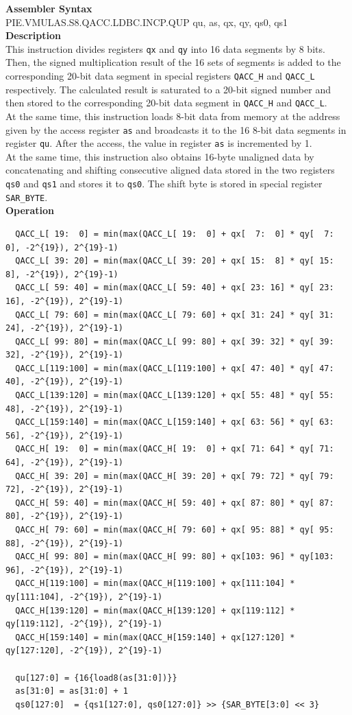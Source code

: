 \textbf{Assembler Syntax} \\
PIE.VMULAS.S8.QACC.LDBC.INCP.QUP qu, as, qx, qy, qs0, qs1 \\
\textbf{Description} \\
This instruction divides registers \lstinline{qx} and \lstinline{qy} into 16 data segments by 8 bits. Then, the signed multiplication result of the 16 sets of segments is added to the corresponding 20-bit data segment in special registers \lstinline{QACC_H} and \lstinline{QACC_L} respectively. The calculated result is saturated to a 20-bit signed number and then stored to the corresponding 20-bit data segment in \lstinline{QACC_H} and \lstinline{QACC_L}.\\
At the same time, this instruction loads 8-bit data from memory at the address given by the access register \lstinline{as} and broadcasts it to the 16 8-bit data segments in register \lstinline{qu}. After the access, the value in register \lstinline{as} is incremented by 1.\\
At the same time, this instruction also obtains 16-byte unaligned data by concatenating and shifting consecutive aligned data stored in the two registers \lstinline{qs0} and \lstinline{qs1} and stores it to \lstinline{qs0}. The shift byte is stored in special register \lstinline{SAR_BYTE}.\\
\textbf{Operation}
\begin{lstlisting}
  QACC_L[ 19:  0] = min(max(QACC_L[ 19:  0] + qx[  7:  0] * qy[  7:  0], -2^{19}), 2^{19}-1)
  QACC_L[ 39: 20] = min(max(QACC_L[ 39: 20] + qx[ 15:  8] * qy[ 15:  8], -2^{19}), 2^{19}-1)
  QACC_L[ 59: 40] = min(max(QACC_L[ 59: 40] + qx[ 23: 16] * qy[ 23: 16], -2^{19}), 2^{19}-1)
  QACC_L[ 79: 60] = min(max(QACC_L[ 79: 60] + qx[ 31: 24] * qy[ 31: 24], -2^{19}), 2^{19}-1)
  QACC_L[ 99: 80] = min(max(QACC_L[ 99: 80] + qx[ 39: 32] * qy[ 39: 32], -2^{19}), 2^{19}-1)
  QACC_L[119:100] = min(max(QACC_L[119:100] + qx[ 47: 40] * qy[ 47: 40], -2^{19}), 2^{19}-1)
  QACC_L[139:120] = min(max(QACC_L[139:120] + qx[ 55: 48] * qy[ 55: 48], -2^{19}), 2^{19}-1)
  QACC_L[159:140] = min(max(QACC_L[159:140] + qx[ 63: 56] * qy[ 63: 56], -2^{19}), 2^{19}-1)
  QACC_H[ 19:  0] = min(max(QACC_H[ 19:  0] + qx[ 71: 64] * qy[ 71: 64], -2^{19}), 2^{19}-1)
  QACC_H[ 39: 20] = min(max(QACC_H[ 39: 20] + qx[ 79: 72] * qy[ 79: 72], -2^{19}), 2^{19}-1)
  QACC_H[ 59: 40] = min(max(QACC_H[ 59: 40] + qx[ 87: 80] * qy[ 87: 80], -2^{19}), 2^{19}-1)
  QACC_H[ 79: 60] = min(max(QACC_H[ 79: 60] + qx[ 95: 88] * qy[ 95: 88], -2^{19}), 2^{19}-1)
  QACC_H[ 99: 80] = min(max(QACC_H[ 99: 80] + qx[103: 96] * qy[103: 96], -2^{19}), 2^{19}-1)
  QACC_H[119:100] = min(max(QACC_H[119:100] + qx[111:104] * qy[111:104], -2^{19}), 2^{19}-1)
  QACC_H[139:120] = min(max(QACC_H[139:120] + qx[119:112] * qy[119:112], -2^{19}), 2^{19}-1)
  QACC_H[159:140] = min(max(QACC_H[159:140] + qx[127:120] * qy[127:120], -2^{19}), 2^{19}-1)

  qu[127:0] = {16{load8(as[31:0])}}
  as[31:0] = as[31:0] + 1
  qs0[127:0]  = {qs1[127:0], qs0[127:0]} >> {SAR_BYTE[3:0] << 3}
\end{lstlisting}

